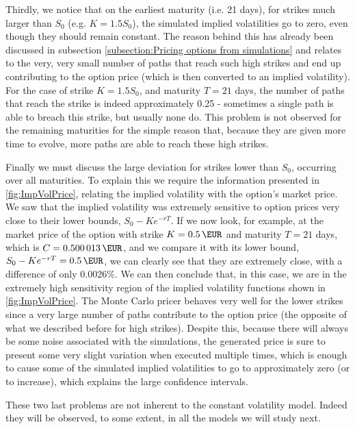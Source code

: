 Thirdly, we notice that on the earliest maturity (i.e. 21 days), for strikes much larger than $S_0$ (e.g. $K=1.5S_0$), the simulated implied volatilities go to zero, even though they should remain constant. The reason behind this has already been discussed in subsection \ref{subsection:Pricing options from simulations} and relates to the very, very small number of paths that reach such high strikes and end up contributing to the option price (which is then converted to an implied volatility). For the case of strike $K=1.5S_0$, and maturity $T=21$ days, the number of paths that reach the strike is indeed approximately 0.25 - sometimes a single path is able to breach this strike, but usually none do. This problem is not observed for the remaining maturities for the simple reason that, because they are given more time to evolve, more paths are able to reach these high strikes.

Finally we must discuss the large deviation for strikes lower than $S_0$, occurring over all maturities. To explain this we require the information presented in \autoref{fig:ImpVolPrice}, relating the implied volatility with the option's market price. We saw that the implied volatility was extremely sensitive to option prices very close to their lower bounds, $S_0-Ke^{-rT}$. If we now look, for example, at the market price of the option with strike $K=\SI{0.5}{\EUR}$ and maturity $T=21$ days, which is $C=\SI{0.500013}{\EUR}$, and we compare it with its lower bound, $S_0-Ke^{-rT}=\SI{0.5}{\EUR}$, we can clearly see that they are extremely close, with a difference of only $0.0026\%$. We can then conclude that, in this case, we are in the extremely high sensitivity region of the implied volatility functions shown in \autoref{fig:ImpVolPrice}.
The Monte Carlo pricer behaves very well for the lower strikes since a very large number of paths contribute to the option price (the opposite of what we described before for high strikes). Despite this, because there will always be some noise associated with the simulations, the generated price is sure to present some very slight variation when executed multiple times, which is enough to cause some of the simulated implied volatilities to go to approximately zero (or to increase), which explains the large confidence intervals.

These two last problems are not inherent to the constant volatility model. Indeed they will be observed, to some extent, in all the models we will study next.




\newpage

